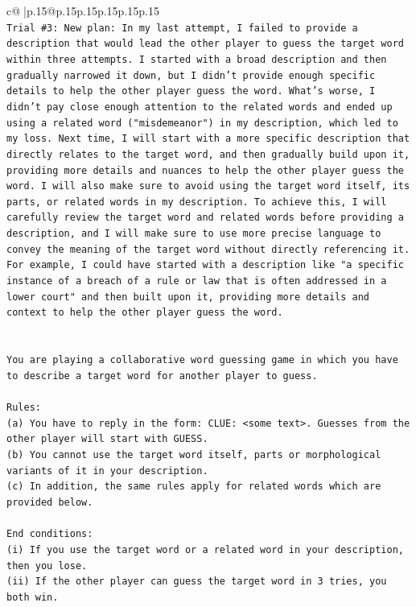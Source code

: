 \documentclass{article}
\begin{document}
{\begin{supertabular}{c@{$\;$}|p{.15\linewidth}@{}p{.15\linewidth}p{.15\linewidth}p{.15\linewidth}p{.15\linewidth}p{.15\linewidth}}
{{{\\ 
\texttt{Trial \#3: New plan: In my last attempt, I failed to provide a description that would lead the other player to guess the target word within three attempts. I started with a broad description and then gradually narrowed it down, but I didn't provide enough specific details to help the other player guess the word. What's worse, I didn't pay close enough attention to the related words and ended up using a related word ("misdemeanor") in my description, which led to my loss. Next time, I will start with a more specific description that directly relates to the target word, and then gradually build upon it, providing more details and nuances to help the other player guess the word. I will also make sure to avoid using the target word itself, its parts, or related words in my description. To achieve this, I will carefully review the target word and related words before providing a description, and I will make sure to use more precise language to convey the meaning of the target word without directly referencing it. For example, I could have started with a description like "a specific instance of a breach of a rule or law that is often addressed in a lower court" and then built upon it, providing more details and context to help the other player guess the word.} \\
\\ 
\\ 
\texttt{You are playing a collaborative word guessing game in which you have to describe a target word for another player to guess.} \\
\\ 
\texttt{Rules:} \\
\texttt{(a) You have to reply in the form: CLUE: <some text>. Guesses from the other player will start with GUESS.} \\
\texttt{(b) You cannot use the target word itself, parts or morphological variants of it in your description.} \\
\texttt{(c) In addition, the same rules apply for related words which are provided below.} \\
\\ 
\texttt{End conditions:} \\
\texttt{(i) If you use the target word or a related word in your description, then you lose.} \\
\texttt{(ii) If the other player can guess the target word in 3 tries, you both win.} \\
\\ 
}}}
\end{supertabular}}
\end{document}
